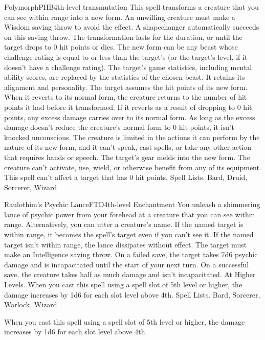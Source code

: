 \begin{spell}{Polymorph}{PHB}{4th-level transmutation}
{
}
This spell transforms a creature that you can see within range into a new form. An unwilling creature must make a Wisdom saving throw to avoid the effect. A shapechanger automatically succeeds on this saving throw.
The transformation lasts for the duration, or until the target drops to 0 hit points or dies. The new form can be any beast whose challenge rating is equal to or less than the target’s (or the target’s level, if it doesn’t have a challenge rating). The target’s game statistics, including mental ability scores, are replaced by the statistics of the chosen beast. It retains its alignment and personality.
The target assumes the hit points of its new form. When it reverts to its normal form, the creature returns to the number of hit points it had before it transformed. If it reverts as a result of dropping to 0 hit points, any excess damage carries over to its normal form. As long as the excess damage doesn’t reduce the creature’s normal form to 0 hit points, it isn’t knocked unconscious.
The creature is limited in the actions it can perform by the nature of its new form, and it can’t speak, cast spells, or take any other action that requires hands or speech.
The target’s gear melds into the new form. The creature can’t activate, use, wield, or otherwise benefit from any of its equipment. This spell can’t affect a target that has 0 hit points.
Spell Lists. Bard, Druid, Sorcerer, Wizard
\end{spell}

\begin{spell}{Raulothim's Psychic Lance}{FTD}{4th-level Enchantment}
{
}
You unleash a shimmering lance of psychic power from your forehead at a creature that you can see within range. Alternatively, you can utter a creature’s name. If the named target is within range, it becomes the spell’s target even if you can’t see it. If the named target isn’t within range, the lance dissipates without effect.
The target must make an Intelligence saving throw. On a failed save, the target takes 7d6 psychic damage and is incapacitated until the start of your next turn. On a successful save, the creature takes half as much damage and isn’t incapacitated.
At Higher Levels. When you cast this spell using a spell slot of 5th level or higher, the damage increases by 1d6 for each slot level above 4th.
Spell Lists. Bard, Sorcerer, Warlock, Wizard

 When you cast this spell using a spell slot of 5th level or higher, the damage increases by 1d6 for each slot level above 4th.
\end{spell}

